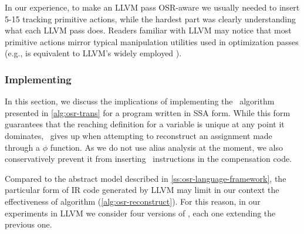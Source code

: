 In our experience, to make an LLVM pass OSR-aware we usually needed to insert 5-15 tracking primitive actions, while the hardest part was clearly understanding what each LLVM pass does. Readers familiar with LLVM may notice that most primitive actions mirror typical manipulation utilities used in optimization passes (e.g.,  is equivalent to LLVM's widely employed ).

\subsubsection*{Implementing }

In this section, we discuss the implications of implementing the \buildcomp\ algorithm presented in \myalgorithm\ref{alg:osr-trans} for a program written in SSA form. While this form guarantees that the reaching definition for a variable is unique at any point it dominates, \reconstruct\ gives up when attempting to reconstruct an assignment made through a $\phi$ function. As we do not use alias analysis at the moment, we also conservatively prevent it from inserting \load\ instructions in the compensation code.

Compared to the abstract model described in \mysection\ref{ss:osr-language-framework}, the particular form of IR code generated by LLVM may limit in our context the effectiveness of algorithm \reconstruct(\myalgorithm\ref{alg:osr-reconstruct}). For this reason, in our experiments in LLVM we consider four versions of \reconstruct, each one extending the previous one.

